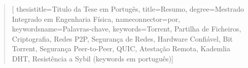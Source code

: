 



\begin{acknowledgements}


\end{acknowledgements}


\begin{abstract}[
	thesistitle={Titulo da Tese em Portugês},
	title={Resumo},
	degree={Mestrado Integrado em Engenharia Física},
	nameconnector={por},
        keywordsname={Palavras-chave},
        keywords={Torrent, Partilha de Ficheiros, Criptografia, Redes P2P, Segurança de Redes, Hardware Confiável, Bit Torrent, Segurança Peer-to-Peer, QUIC, Atestação Remota, Kademlia DHT, Resistência a Sybil (keywords em português)}]
\begin{otherlanguage}{portuguese}


\end{otherlanguage}
\end{abstract}
\begin{abstract}


\end{abstract}

